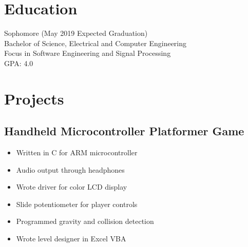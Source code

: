 \documentclass{cv_class}
\begin{document}
\begin{twocols}
\section{Education}%
%
Sophomore (May 2019 Expected Graduation) \\
Bachelor of Science, Electrical and Computer Engineering \\
Focus in Software Engineering and Signal Processing \\
GPA: 4.0
\section{Projects}%
\subsection{Handheld Microcontroller Platformer Game}
\begin{itemize}%
\item Written in C for ARM microcontroller
\item Audio output through headphones
\item Wrote driver for color LCD display
\item Slide potentiometer for player controls
\item Programmed gravity and collision detection
\item Wrote level designer in Excel VBA
\end{itemize}%
\end{twocols}
\end{document}
